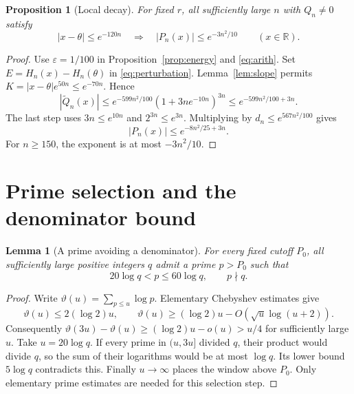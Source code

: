 \documentclass[11pt]{article}
\newtheorem{lemma}[theorem]{Lemma}
\newtheorem{proposition}[theorem]{Proposition}
\numberwithin{equation}{section}
\newcommand{\R}{\mathbb R}
\begin{document}
\begin{proposition}[Local decay]\label{prop:local}
For fixed $r$, all sufficiently large $n$ with $Q_n\ne0$ satisfy
\begin{equation}\label{eq:local}
 |x-\theta|\leq e^{-120n}
              \quad\Longrightarrow\quad |P_n(x)|\leq e^{-3n^2/10}
              \qquad(x\in\R).
\end{equation}
\end{proposition}
\begin{proof}
Use $\varepsilon=1/100$ in Proposition~\ref{prop:energy} and
\eqref{eq:arith}. Set $E=H_n(x)-H_n(\theta)$ in
\eqref{eq:perturbation}. Lemma~\ref{lem:slope} permits
$K=|x-\theta|e^{50n}\leq e^{-70n}$. Hence
\[
 |\widetilde Q_n(x)|\leq e^{-599n^2/100}(1+3ne^{-10n})^{3n}
                     \leq e^{-599n^2/100+3n}.
\]
The last step uses $3n\leq e^{10n}$ and $2^{3n}\leq e^{3n}$.
Multiplying by $d_n\leq e^{567n^2/100}$ gives
\[
                         |P_n(x)|\leq e^{-8n^2/25+3n}.
\]
For $n\geq150$, the exponent is at most $-3n^2/10$.
\end{proof}

\section{Prime selection and the denominator bound}\label{sec:exponent}

\begin{lemma}[A prime avoiding a denominator]\label{lem:prime}
For every fixed cutoff $P_0$, all sufficiently large positive integers
$q$ admit a prime $p>P_0$ such that
\[
                    20\log q<p\leq60\log q,\qquad p\nmid q.
\]
\end{lemma}
\begin{proof}
Write $\vartheta(u)=\sum_{p\leq u}\log p$.
Elementary Chebyshev estimates give
\[
 \vartheta(u)\leq2(\log2)u,\qquad
 \vartheta(u)\geq(\log2)u-O(\sqrt u\log(u+2)).
\]
Consequently
$\vartheta(3u)-\vartheta(u)\geq(\log2)u-o(u)>u/4$
for sufficiently large $u$.
Take $u=20\log q$. If every prime in $(u,3u]$ divided $q$, their
product would divide $q$, so the sum of their logarithms would be at
most $\log q$. Its lower bound $5\log q$ contradicts this.
Finally $u\to\infty$ places the window above $P_0$.
Only elementary prime estimates are needed for this selection step.
\end{proof}
\end{document}
